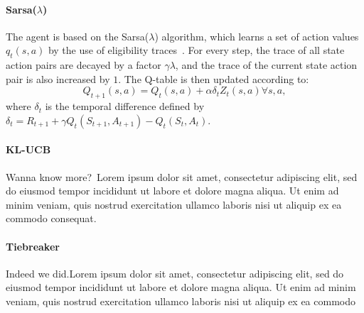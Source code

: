 
\paragraph{Sarsa($\lambda$)}
The agent is based on the Sarsa($\lambda$) algorithm, which learns a set of
action values $q_t(s,a)$ by the use of eligibility
traces~\cite{Sutton:1998:IRL:551283}. For every step, the trace of all state
action pairs are decayed by a factor $\gamma\lambda$, and the trace of the
current state action pair is also increased by $1$. The Q-table is then updated
according to:
\begin{equation}
        Q_{t+1}(s,a) = Q_t(s,a) + \alpha\delta_t Z_t(s,a) \forall s,a,
\end{equation}
where $\delta_t$ is the temporal difference defined by $\delta_t = R_{t+1} +
\gamma Q_t(S_{t+1},A_{t+1}) - Q_t(S_t,A_t)$.


\paragraph{KL-UCB}
Wanna know more?~\cite{DBLP:journals/jmlr/GarivierC11}Lorem ipsum dolor sit
amet, consectetur adipiscing elit, sed do eiusmod tempor incididunt ut labore et
dolore magna aliqua. Ut enim ad minim veniam, quis nostrud exercitation ullamco
laboris nisi ut aliquip ex ea commodo consequat. 

\paragraph{Tiebreaker}
Indeed we did.Lorem ipsum dolor sit amet, consectetur adipiscing elit, sed do
eiusmod tempor incididunt ut labore et dolore magna aliqua. Ut enim ad minim
veniam, quis nostrud exercitation ullamco laboris nisi ut aliquip ex ea commodo

